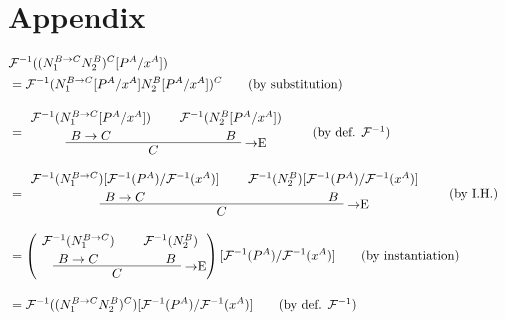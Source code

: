 \chapter*{Appendix}

\begin{align*}
\lefteqn{\chmapantasub{(N_1^{B \to C}N_2^B)^C}{P^A}{x^A}} \\
  &=
  \chmapanta{(N_1^{B \to C}[P^A/x^A]N_2^B[P^A/x^A])^C}
  \tag{by substitution} \\[10pt]
  &=
  \implelim{%
    \AxiomC{$\chmapantasub{N_1^{B \to C}}{P^A}{x^A}$}\noLine\UnaryInfC{$B \to C$}
  }{%
    \AxiomC{$\chmapantasub{N_2^B}{P^A}{x^A}$}\noLine\UnaryInfC{$B$}
  }{$C$}
  \DisplayProof
  \tag{by def. $\chmapanta$} \\[10pt]
  &=
  \implelim{%
    \AxiomC{$\subchmapanta{N_1^{B \to C}}{P^A}{x^A}$}\noLine\UnaryInfC{$B \to C$}
  }{%
    \AxiomC{$\subchmapanta{N_2^B}{P^A}{x^A}$}\noLine\UnaryInfC{$B$}
  }{$C$}
  \DisplayProof
  \tag{by I.H.} \\[10pt]
  &=
  \left(
  \implelim{%
    \AxiomC{$\chmapanta(N_1^{B \to C})$}\noLine\UnaryInfC{$B \to C$}
  }{%
    \AxiomC{$\chmapanta(N_2^B)$}\noLine\UnaryInfC{$B$}
  }{$C$}
  \DisplayProof
  \right)[\chmapanta(P^A)/\chmapanta(x^A)]
  \tag{by instantiation} \\[10pt]
  &=
  \subchmapanta{(N_1^{B \to C}N_2^B)^C}{P^A}{x^A}
  \tag{by def. $\chmapanta$}
\end{align*}

